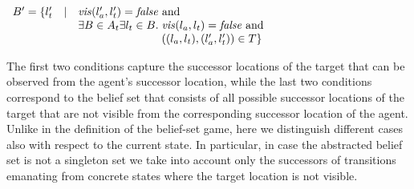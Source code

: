 \begin{itemize}
\begin{itemize}
$\begin{array}{lll}
B' = \{l_t' & \mid & \mathit{vis}(l_a',l_t') = \mathit{false} \text{ and }\\
&&\exists B \in A_t \exists l_t \in B.\; \mathit{vis}(l_a,l_t) = \mathit{false} \text{ and }\\
&&\phantom{\exists B \in A_t \exists l_t \in B.\;} ((l_a,l_t),(l_a',l_t')) \in T
\}
\end{array}
$
\end{itemize}
The first two conditions capture the successor locations of the target that can be observed from the agent's successor location, while the last two conditions  correspond to the belief set that consists of all possible successor locations of the target that are not visible from the corresponding successor location of the agent. Unlike in the definition of the belief-set game, here we distinguish different cases also with respect to the current state. In particular, in case the abstracted belief set is not a singleton set we take into account only the successors of transitions emanating from concrete states where the target location is not visible.

\end{itemize}



